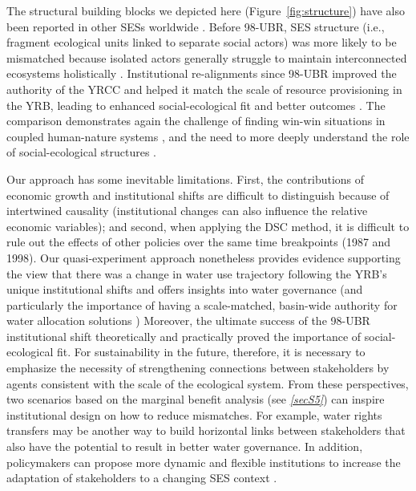 \documentclass[default, sn-standardnature]{sn-jnl}
\begin{document}
The structural building blocks we depicted here (Figure~\ref{fig:structure}) have also been reported in other SESs worldwide \cite{kluger2020,guerrero2015,bodin2012}.
Before 98-UBR, SES structure (i.e., fragment ecological units linked to separate social actors) was more likely to be mismatched because isolated actors generally struggle to maintain interconnected ecosystems holistically \cite{sayles2017,sayles2019,cai2016,bergsten2019}.
Institutional re-alignments since 98-UBR improved the authority of the YRCC and helped it match the scale of resource provisioning in the YRB, leading to enhanced social-ecological fit and better outcomes \cite{cumming2020a,wang2019d}.
The comparison demonstrates again the challenge of finding win-win situations in coupled human-nature systems \cite{hegwood2022}, and the need to more deeply understand the role of social-ecological structures \cite{bergsten2019, sayles2019}.


Our approach has some inevitable limitations.
First, the contributions of economic growth and institutional shifts are difficult to distinguish because of intertwined causality (institutional changes can also influence the relative economic variables);
and second, when applying the DSC method, it is difficult to rule out the effects of other policies over the same time breakpoints (1987 and 1998).
Our quasi-experiment approach nonetheless provides evidence supporting the view that there was a change in water use trajectory following the YRB's unique institutional shifts and offers insights into water governance (and particularly the importance of having a scale-matched, basin-wide authority for water allocation solutions \cite{bodin2017b, ostrom2009, reyers2018})
Moreover, the ultimate success of the 98-UBR institutional shift theoretically and practically proved the importance of social-ecological fit.
For sustainability in the future, therefore, it is necessary to emphasize the necessity of strengthening connections between stakeholders by agents consistent with the scale of the ecological system.
From these perspectives, two scenarios based on the marginal benefit analysis (see \textit{\ref{secS5}}) can inspire institutional design on how to reduce mismatches.
For example, water rights transfers may be another way to build horizontal links between stakeholders that also have the potential to result in better water governance.
In addition, policymakers can propose more dynamic and flexible institutions to increase the adaptation of stakeholders to a changing SES context \cite{reyers2018}.
\end{document}
